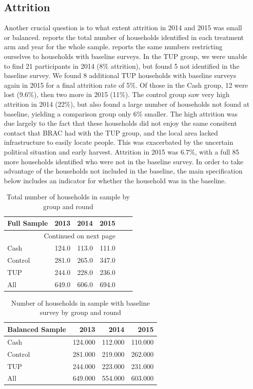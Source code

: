 \documentclass[12pt,article]{article}
\begin{document}
\subsection*{Attrition}
\label{sec-3-2}

Another crucial question is to what extent attrition in 2014 and 2015 was small or
balanced.  reports the total number of households identified in
each treatment arm and year for the whole sample. 
reports the same numbers restricting ourselves to households with baseline surveys.
In the TUP group, we were unable to find 21 participants in 2014 (8\% attrition), but
found 5 not identified in the baseline survey. We found 8 additional TUP households
with baseline surveys again in 2015 for a final attrition rate of 5\%. Of those in the
Cash group, 12 were lost (9.6\%), then two more in 2015 (11\%). The control group saw
very high attrition in 2014 (22\%), but also found a large number of households not
found at baseline, yielding a comparison group only 6\% smaller. The high attrition
was due largely to the fact that these households did not enjoy the same consitent
contact that BRAC had with the TUP group, and the local area lacked infrastructure to
easily locate people. This was exacerbated by the uncertain political situation and
early harvest. Attrition in 2015 was 6.7\%, with a full 85 more households identified
who were not in the baseline survey. In order to take advantage of the households not
included in the baseline, the main specification below includes an indicator for
whether the household was in the baseline.


\newpage

\begin{longtable}{lrrrrr}
\caption{\label{tab:attrition_count}Total number of households in sample by group and round}
\\
\hline
Full Sample & 2013 & 2014 & 2015\\
\hline
\endhead
\hline\multicolumn{4}{r}{Continued on next page} \\
\endfoot
\endlastfoot
Cash & 124.0 & 113.0 & 111.0\\
Control & 281.0 & 265.0 & 347.0\\
TUP & 244.0 & 228.0 & 236.0\\
\hline
All & 649.0 & 606.0 & 694.0\\
\hline
\end{longtable}

\begin{table}[htb]
\caption{\label{tab:attrition_balanced_count}Number of households in sample with baseline survey by group and round}
\centering
\begin{tabular}{lrrr}
\hline
Balanced Sample & 2013 & 2014 & 2015\\
\hline
Cash & 124.000 & 112.000 & 110.000\\
Control & 281.000 & 219.000 & 262.000\\
TUP & 244.000 & 223.000 & 231.000\\
\hline
All & 649.000 & 554.000 & 603.000\\
\hline
\end{tabular}
\end{table}
\end{document}
